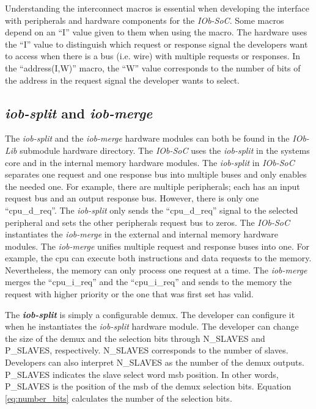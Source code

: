 Understanding the interconnect macros is essential when developing the interface with peripherals and hardware components for the \textit{IOb-SoC}. Some macros depend on an \enquote{I} value given to them when using the macro. The hardware uses the  \enquote{I} value to distinguish which request or response signal the developers want to access when there is a bus (i.e. wire) with multiple requests or responses. In the \enquote{address(I,W)} macro, the \enquote{W} value corresponds to the number of bits of the address in the request signal the developer wants to select.

\subsection{\textit{iob-split} and \textit{iob-merge}}
\label{subsection:iob_split_merge}
The \textit{iob-split} and the \textit{iob-merge} hardware modules can both be found in the \textit{IOb-Lib} submodule hardware directory. The \textit{IOb-SoC} uses the \textit{iob-split} in the systems core and in the internal memory hardware modules. The \textit{iob-split} in \textit{IOb-SoC} separates one request and one response bus into multiple buses and only enables the needed one. For example, there are multiple peripherals; each has an input request bus and an output response bus. However, there is only one \enquote{cpu\_d\_req}. The \textit{iob-split} only sends the \enquote{cpu\_d\_req} signal to the selected peripheral and sets the other peripherals request bus to zeros. The \textit{IOb-SoC} instantiates the \textit{iob-merge} in the external and internal memory hardware modules. The \textit{iob-merge} unifies multiple request and response buses into one. For example, the \acrshort{cpu} can execute both instructions and data requests to the memory. Nevertheless, the memory can only process one request at a time. The \textit{iob-merge} merges the \enquote{cpu\_i\_req} and the \enquote{cpu\_i\_req} and sends to the memory the request with higher priority or the one that was first set has valid.

The \textbf{\textit{iob-split}} is simply a configurable \acrfull{demux}. The developer can configure it when he instantiates the \textit{iob-split} hardware module. The developer can change the size of the \acrlong{demux} and the selection bits through N\_SLAVES and P\_SLAVES, respectively. N\_SLAVES corresponds to the number of slaves. Developers can also interpret N\_SLAVES as the number of the \acrshort{demux} outputs. P\_SLAVES indicates the slave select word \acrfull{msb} position. In other words, P\_SLAVES is the position of the \acrshort{msb} of the \acrlong{demux} selection bits. Equation \ref{eq:number_bits} calculates the number of the selection bits.

